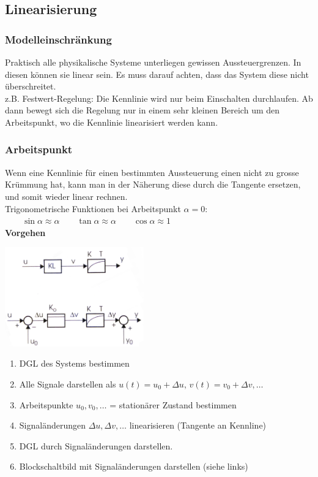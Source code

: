 \newpage

	\subsection{Linearisierung}
		\subsubsection{Modelleinschränkung }
			Praktisch alle physikalische Systeme unterliegen gewissen Aussteuergrenzen.
			In diesen können sie linear sein. Es muss darauf achten, dass  das System
			diese nicht überschreitet. \\
			z.B. Festwert-Regelung: Die Kennlinie wird nur beim Einschalten durchlaufen.
			Ab dann bewegt sich die Regelung nur in einem sehr kleinen Bereich um den
			Arbeitspunkt, wo die Kennlinie linearisiert werden kann. \\
			
		\subsubsection{Arbeitspunkt }
			Wenn eine Kennlinie für einen bestimmten Aussteuerung einen nicht zu grosse
			Krümmung hat, kann man in der Näherung diese durch die Tangente ersetzen, und
			somit wieder linear rechnen. \\
			Trigonometrische Funktionen bei Arbeitspunkt $\alpha = 0$: $\qquad \sin \alpha \approx
			\alpha \qquad \tan \alpha \approx \alpha \qquad \cos \alpha \approx 1$ \\
			\textbf{Vorgehen} \\
			\begin{minipage}[c]{6cm}
				\includegraphics[width=6cm]{bilder/LinArbeitspunkt}
			\end{minipage}
			\begin{minipage}[c]{12cm}
				\begin{enumerate}
					\item DGL des Systems bestimmen
					\item Alle Signale darstellen als $u(t)=u_0+\Delta u,\,v(t)=v_0+\Delta v,\dots$
					\item Arbeitspunkte $u_0,v_0,\dots$ = stationärer Zustand bestimmen
					\item Signaländerungen $\Delta u, \Delta v, \dots$ linearisieren
							(Tangente an Kennline)
					\item DGL durch Signaländerungen darstellen.
					\item Blockschaltbild mit Signaländerungen darstellen (siehe links)
				\end{enumerate}
			\end{minipage}
			
